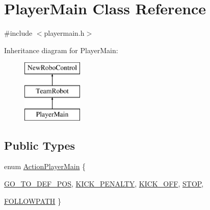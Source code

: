 \hypertarget{classPlayerMain}{
\section{PlayerMain Class Reference}
\label{classPlayerMain}
}


{\ttfamily \#include $<$playermain.h$>$}

Inheritance diagram for PlayerMain:\begin{figure}[H]
\begin{center}
\leavevmode
\includegraphics[height=3cm]{classPlayerMain}
\end{center}
\end{figure}
\subsection*{Public Types}
\begin{DoxyCompactItemize}
\item 
enum \hyperlink{classPlayerMain_af07f952a547b2902a452c1413f26dae2}{ActionPlayerMain} \{ \par
\hyperlink{classPlayerMain_af07f952a547b2902a452c1413f26dae2ad110267c0dfd47655250b6e11cb333ed}{GO\_\-TO\_\-DEF\_\-POS}, 
\hyperlink{classPlayerMain_af07f952a547b2902a452c1413f26dae2a3bfe9a85c58f83e457c2515fab072d03}{KICK\_\-PENALTY}, 
\hyperlink{classPlayerMain_af07f952a547b2902a452c1413f26dae2aa3a0ef85cf87cfe01eb07e7d72e959cd}{KICK\_\-OFF}, 
\hyperlink{classPlayerMain_af07f952a547b2902a452c1413f26dae2a182faa57b0ea5f67cd916a9261df12dc}{STOP}, 
\par
\hyperlink{classPlayerMain_af07f952a547b2902a452c1413f26dae2a19eca8a0a0720f6c698f344b4e6ffb72}{FOLLOWPATH}
 \}
\end{DoxyCompactItemize}
